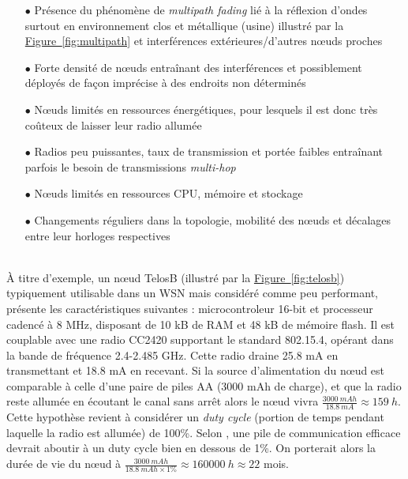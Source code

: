 \documentclass[]{report}
\newcommand{\wordlink}[2]{\hyperref[#2]{#1~\ref{#2}}}
\begin{document}
\begin{itemize}
\item[$\bullet$] Présence du phénomène de \textit{multipath fading} lié à la réflexion d'ondes surtout en environnement clos et métallique (usine) illustré par la \wordlink{Figure}{fig:multipath} et interférences extérieures/d'autres nœuds proches
\vspace{0.2cm}
\item[$\bullet$] Forte densité de nœuds entraînant des interférences et possiblement déployés de façon imprécise à des endroits non déterminés
\vspace{0.2cm}
\item[$\bullet$] Nœuds limités en ressources énergétiques, pour lesquels il est donc très coûteux de laisser leur radio allumée
\vspace{0.2cm}
\item[$\bullet$] Radios peu puissantes, taux de transmission et portée faibles entraînant parfois le besoin de transmissions \textit{multi-hop}
\vspace{0.2cm}
\item[$\bullet$] Nœuds limités en ressources CPU, mémoire et stockage
\vspace{0.2cm}
\item[$\bullet$] Changements réguliers dans la topologie, mobilité des nœuds et décalages entre leur horloges respectives
\end{itemize}
~\\


À titre d'exemple, un nœud TelosB (illustré par la \wordlink{Figure}{fig:telosb}) typiquement utilisable dans un WSN mais considéré comme peu performant, présente les caractéristiques suivantes : microcontroleur 16-bit et processeur cadencé à 8 MHz, disposant de 10 kB de RAM et 48 kB de mémoire flash. Il est couplable avec une radio CC2420 supportant le standard 802.15.4, opérant dans la bande de fréquence 2.4-2.485 GHz. Cette radio draine 25.8 mA en transmettant et 18.8 mA en recevant. Si la source d'alimentation du nœud est comparable à celle d'une paire de piles AA (3000 mAh de charge), et que la radio reste allumée en écoutant le canal sans arrêt alors le nœud vivra $\frac{3000\: mAh}{18.8\: mA} \approx 159\: h$. Cette hypothèse revient à considérer un \textit{duty cycle} (portion de temps pendant laquelle la radio est allumée) de 100\%. Selon \cite{stack-IoT}, une pile de communication efficace devrait aboutir à un duty cycle bien en dessous de 1\%. On porterait alors la durée de vie du nœud à $\frac{3000\:mAh}{18.8\: mAh \times 1\%} \approx 160000\:h \approx 22 $ mois.\\
\end{document}
